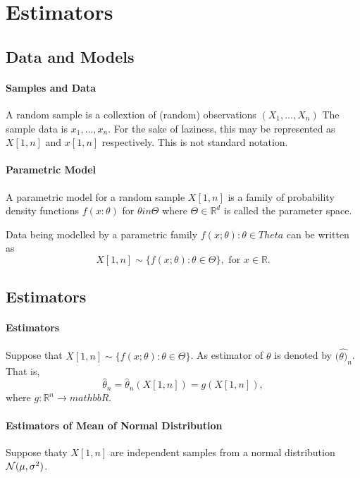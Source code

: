 \section{Estimators}

\subsection{Data and Models}

\paragraph{Samples and Data}
A random sample is a collextion of (random) observations
\((X_1, \ldots, X_n)\)
The sample data is \(x_1, \ldots, x_n\).
For the sake of laziness, this may be represented as
\(X[1, n]\) and  \(x[1, n]\) respectively.
This is not standard notation.

\paragraph{Parametric Model}
A parametric model for a random sample \(X[1, n]\)
is a family of probability density functions
\(f(x : \theta)\) for \(\theta in \Theta\) where \(\Theta \in  \mathbb{R}^d\)
is called the parameter space.

Data being modelled by a parametric family \(f(x; \theta): \theta \in  Theta\)
can be written as \[
  X[1, n] \sim \{f(x; \theta) : \theta \in \Theta\}, \text{ for } x \in \mathbb{R}
.\] 

\subsection{Estimators}

\paragraph{Estimators}
Suppose that \(X[1, n] \sim \{f(x; \theta) : \theta \in \Theta\} \).
As estimator of \(\theta\) is denoted by \((\hat{\theta)}_n\).
That is, \[
  \hat{\theta}_n = \hat{\theta}_n(X[1, n]) = g(X[1, n]),
\]  where \(g: \mathbb{R}^n \to mathbb{R}\).

\paragraph{Estimators of Mean of Normal Distribution}
Suppose thaty \(X[1, n]\) are independent samples from a normal distribution
\(\mathcal{N}(\mu, \sigma^2)\).

